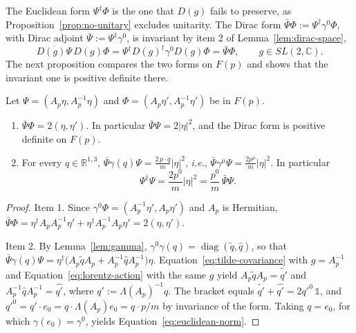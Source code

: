 The Euclidean form $\Psi^\dagger\Phi$ is the one that $D(g)$ fails to preserve, as Proposition~\ref{prop:no-unitary} excludes unitarity. The Dirac form $\bar{\Psi}\Phi:=\Psi^\dagger\gamma^0\Phi$, with Dirac adjoint $\bar{\Psi}:=\Psi^\dagger\gamma^0$, is invariant by item 2 of Lemma~\ref{lem:dirac-space},
\begin{equation}\label{eq:dirac-form-invariance}
	\overline{D(g)\Psi}\,D(g)\Phi=\Psi^\dagger D(g)^\dagger\gamma^0D(g)\Phi=\bar{\Psi}\Phi,\qquad g\in SL(2,\mathbb{C}).
\end{equation}
The next proposition compares the two forms on $F(p)$ and shows that the invariant one is positive definite there.

\begin{proposition}\label{prop:norms}
	Let $\Psi=(A_p\eta,A_p^{-1}\eta)$ and $\Phi=(A_p\eta',A_p^{-1}\eta')$ be in $F(p)$.
	\begin{enumerate}
		\item $\bar{\Psi}\Phi=2(\eta,\eta')$. In particular $\bar{\Psi}\Psi=2|\eta|^2$, and the Dirac form is positive definite on $F(p)$.
		\item For every $q\in\mathbb{R}^{1,3}$, $\bar{\Psi}\gamma(q)\Psi=\frac{2\,p\cdot q}{m}|\eta|^2$, \textit{i.e.}, $\bar{\Psi}\gamma^\mu\Psi=\frac{2p^\mu}{m}|\eta|^2$. In particular
		\begin{equation}\label{eq:euclidean-norm}
			\Psi^\dagger\Psi=\frac{2p^0}{m}|\eta|^2=\frac{p^0}{m}\,\bar{\Psi}\Psi.
		\end{equation}
	\end{enumerate}
\end{proposition}

\begin{proof}
	Item 1. Since $\gamma^0\Phi=(A_p^{-1}\eta',A_p\eta')$ and $A_p$ is Hermitian, $\bar{\Psi}\Phi=\eta^\dagger A_pA_p^{-1}\eta'+\eta^\dagger A_p^{-1}A_p\eta'=2(\eta,\eta')$.
	
	Item 2. By Lemma~\ref{lem:gamma}, $\gamma^0\gamma(q)=\operatorname{diag}(\tilde{q},\hat{q})$, so that $\bar{\Psi}\gamma(q)\Psi=\eta^\dagger\big(A_p\tilde{q}A_p+A_p^{-1}\hat{q}A_p^{-1}\big)\eta$. Equation~\eqref{eq:tilde-covariance} with $g=A_p^{-1}$ and Equation~\eqref{eq:lorentz-action} with the same $g$ yield $A_p\tilde{q}A_p=\widetilde{q'}$ and $A_p^{-1}\hat{q}A_p^{-1}=\widehat{q'}$, where $q':=\Lambda(A_p)^{-1}q$. The bracket equals $\widetilde{q'}+\widehat{q'}=2q'^0\,\mathbb{1}$, and $q'^0=q'\cdot e_0=q\cdot\Lambda(A_p)e_0=q\cdot p/m$ by invariance of the form. Taking $q=e_0$, for which $\gamma(e_0)=\gamma^0$, yields Equation~\eqref{eq:euclidean-norm}.
\end{proof}

